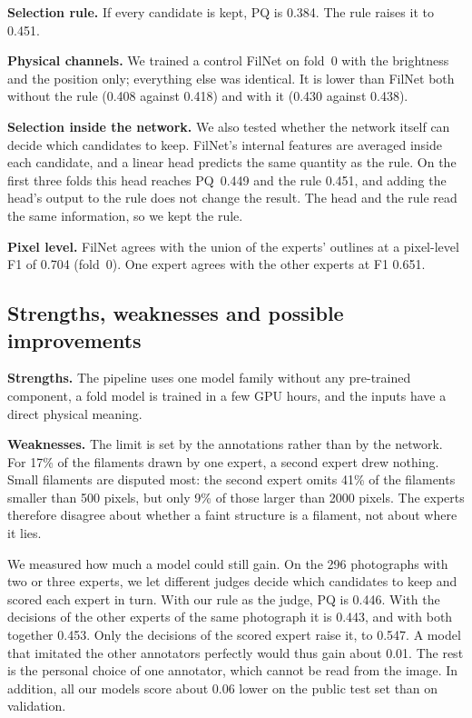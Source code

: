 \documentclass[sigconf]{acmart}
\newcommand{\oofpq}{0.451}           %
\newcommand{\ooffixed}{0.384}        %
\begin{document}
\textbf{Selection rule.} If every candidate is kept, PQ is \ooffixed{}. The rule raises it to \oofpq{}.

\textbf{Physical channels.} We trained a control FilNet on fold~0 with the brightness and the position only; everything else was identical. It is lower than FilNet both without the rule (0.408 against 0.418) and with it (0.430 against 0.438).

\textbf{Selection inside the network.} We also tested whether the network itself can decide which candidates to keep. FilNet's internal features are averaged inside each candidate, and a linear head predicts the same quantity as the rule. On the first three folds this head reaches PQ~0.449 and the rule 0.451, and adding the head's output to the rule does not change the result. The head and the rule read the same information, so we kept the rule.

\textbf{Pixel level.} FilNet agrees with the union of the experts' outlines at a pixel-level F1 of 0.704 (fold~0). One expert agrees with the other experts at F1 0.651.

\subsection{Strengths, weaknesses and possible improvements}
\textbf{Strengths.} The pipeline uses one model family without any pre-trained component, a fold model is trained in a few GPU hours, and the inputs have a direct physical meaning.

\textbf{Weaknesses.} The limit is set by the annotations rather than by the network. For 17\% of the filaments drawn by one expert, a second expert drew nothing. Small filaments are disputed most: the second expert omits 41\% of the filaments smaller than 500 pixels, but only 9\% of those larger than 2000 pixels. The experts therefore disagree about whether a faint structure is a filament, not about where it lies.

We measured how much a model could still gain. On the 296 photographs with two or three experts, we let different judges decide which candidates to keep and scored each expert in turn. With our rule as the judge, PQ is 0.446. With the decisions of the other experts of the same photograph it is 0.443, and with both together 0.453. Only the decisions of the scored expert raise it, to 0.547. A model that imitated the other annotators perfectly would thus gain about 0.01. The rest is the personal choice of one annotator, which cannot be read from the image. In addition, all our models score about 0.06 lower on the public test set than on validation.
\end{document}
